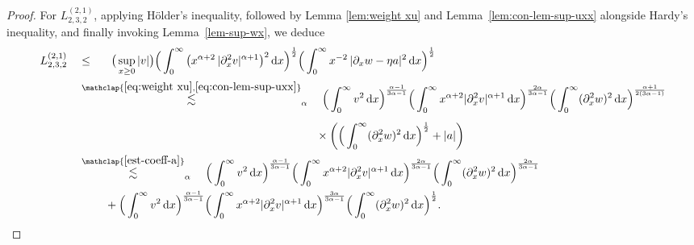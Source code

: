 \documentclass[reqno,12pt]{amsart}
\renewcommand{\d}{\ensuremath{\mathrm{d}}}
\renewcommand{\d}{\ensuremath{{\rm d}}}
\numberwithin{equation}{section}
\begin{document}
\begin{proof}
%
\bigskip
%

For $ L_{2,3,2}^{(2,1)}$, applying H\"older's inequality, followed by Lemma \ref{lem:weight xu} and Lemma~\ref{lem:con-lem-sup-uxx} alongside Hardy's inequality, and finally invoking Lemma~\ref{lem-sup-wx}, we deduce
\begin{align} \label{eq:L232_21}
 L_{2,3,2}^{(2,1)} \quad
    &\leq_{\phantom{\alpha}} \quad
    \big(\sup_{x\geq 0} |v|\big)
    \Big( \int_0^\infty \big(x^{\alpha +2} \, |\partial_x^2 v|^{\alpha +1}\big)^2 \, \d x\Big)^\frac{1}{2}
    \Big(\int_0^\infty x^{-2}\,|\partial_x w - \eta a|^2 \, \d x \Big)^{\frac{1}{2}} \nonumber
    \\
    &\stackrel{\mathclap{\eqref{eq:weight xu}, \eqref{eq:con-lem-sup-uxx}}}{\lesssim}_{\alpha}  \quad 
    \Big(\int_0^\infty v^2\, \d x\Big)^\frac{\alpha-1}{3\alpha-1}
    \Big(\int_0^\infty x^{\alpha+2} |\partial_x^2 v|^{\alpha+1}\, \d x\Big)^\frac{2\alpha}{3\alpha-1}
    \Big(  \int_0^\infty (\partial_x^2 w)^2 \, \d x\Big)^\frac{\alpha+1}{2(3\alpha-1)} \nonumber
    \\
    &\phantom{\stackrel{\mathclap{\eqref{eq:weight xu}, \eqref{eq:con-lem-sup-uxx}}}{\lesssim}_{\alpha}} \quad 
    \times
    \bigg(\Big(\int_0^\infty (\partial_x^2 w)^2\, \d x\Big)^\frac{1}{2} + |a| \bigg) \nonumber 
    \\
    &\stackrel{\mathclap{\eqref{est-coeff-a}}}{\lesssim}_{\alpha} \quad 
    \Big(\int_0^\infty v^2\, \d x\Big)^\frac{\alpha-1}{3\alpha-1} \Big(\int_0^\infty x^{\alpha+2} |\partial_x^2 v|^{\alpha+1}\, \d x\Big)^\frac{2\alpha}{3\alpha-1} 
    \Big(\int_0^\infty  (\partial_x^2 w)^2\, \d x\Big)^\frac{2\alpha}{3\alpha-1}\nonumber
    \\
    &\phantom{\lesssim_\alpha} \quad 
    + 
    \Big(\int_0^\infty v^2\, \d x\Big)^\frac{\alpha-1}{3\alpha-1} \Big(\int_0^\infty x^{\alpha+2} |\partial_x^2 v|^{\alpha+1}\, \d x\Big)^\frac{3\alpha}{3\alpha-1} 
    \Big(\int_0^\infty  (\partial_x^2 w)^2\, \d x\Big)^\frac{1}{2}.
\end{align}
%

%
\bigskip
%


\end{proof}
\end{document}
